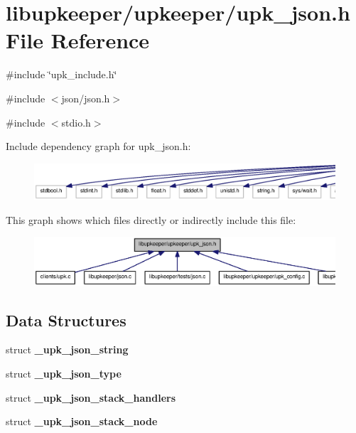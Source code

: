 \section{libupkeeper/upkeeper/upk\_\-json.h File Reference}
\label{upk__json_8h}
{\ttfamily \#include \char`\"{}upk\_\-include.h\char`\"{}}\par
{\ttfamily \#include $<$json/json.h$>$}\par
{\ttfamily \#include $<$stdio.h$>$}\par
Include dependency graph for upk\_\-json.h:\nopagebreak
\begin{figure}[H]
\begin{center}
\leavevmode
\includegraphics[width=400pt]{upk__json_8h__incl}
\end{center}
\end{figure}
This graph shows which files directly or indirectly include this file:\nopagebreak
\begin{figure}[H]
\begin{center}
\leavevmode
\includegraphics[width=400pt]{upk__json_8h__dep__incl}
\end{center}
\end{figure}
\subsection*{Data Structures}
\begin{DoxyCompactItemize}
\item 
struct {\bf \_\-upk\_\-json\_\-string}
\item 
struct {\bf \_\-upk\_\-json\_\-type}
\item 
struct {\bf \_\-upk\_\-json\_\-stack\_\-handlers}
\item 
struct {\bf \_\-upk\_\-json\_\-stack\_\-node}
\end{DoxyCompactItemize}
